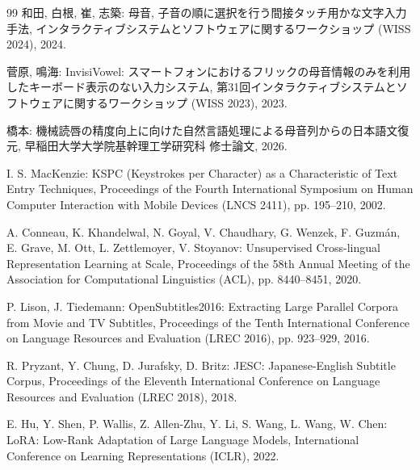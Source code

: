 \begin{thebibliography}{99}
\colorbox{tbd}{和田, 白根, 崔, 志築}:  %
母音, 子音の順に選択を行う間接タッチ用かな文字入力手法,
インタラクティブシステムとソフトウェアに関するワークショップ (WISS 2024), 2024.

\colorbox{tbd}{菅原, 鳴海}:  %
InvisiVowel: スマートフォンにおけるフリックの母音情報のみを利用したキーボード表示のない入力システム,
第31回インタラクティブシステムとソフトウェアに関するワークショップ (WISS 2023), 2023.

\colorbox{tbd}{橋本}:  %
機械読唇の精度向上に向けた自然言語処理による母音列からの日本語文復元,
早稲田大学大学院基幹理工学研究科 修士論文, 2026.

\colorbox{tbd}{I. S. MacKenzie}:  %
KSPC (Keystrokes per Character) as a Characteristic of Text Entry Techniques,
Proceedings of the Fourth International Symposium on Human Computer Interaction with Mobile Devices (LNCS 2411), pp. 195--210, 2002.  %

\colorbox{tbd}{A. Conneau, K. Khandelwal, N. Goyal, V. Chaudhary, G. Wenzek, F. Guzmán, E. Grave, M. Ott, L. Zettlemoyer, V. Stoyanov}:  %
Unsupervised Cross-lingual Representation Learning at Scale,
Proceedings of the 58th Annual Meeting of the Association for Computational Linguistics (ACL), pp. 8440--8451, 2020.

\colorbox{tbd}{P. Lison, J. Tiedemann}:  %
OpenSubtitles2016: Extracting Large Parallel Corpora from Movie and TV Subtitles,
Proceedings of the Tenth International Conference on Language Resources and Evaluation (LREC 2016), pp. 923--929, 2016.

\colorbox{tbd}{R. Pryzant, Y. Chung, D. Jurafsky, D. Britz}:  %
JESC: Japanese-English Subtitle Corpus,
Proceedings of the Eleventh International Conference on Language Resources and Evaluation (LREC 2018), 2018.

\colorbox{tbd}{E. Hu,} \colorbox{tbd}{Y. Shen,} \colorbox{tbd}{P. Wallis,} \colorbox{tbd}{Z. Allen-Zhu,} \colorbox{tbd}{Y. Li,} \colorbox{tbd}{S. Wang,} \colorbox{tbd}{L. Wang,} \colorbox{tbd}{W. Chen}:  %
LoRA: Low-Rank Adaptation of Large Language Models,
International Conference on Learning Representations (ICLR), 2022.

\end{thebibliography}
